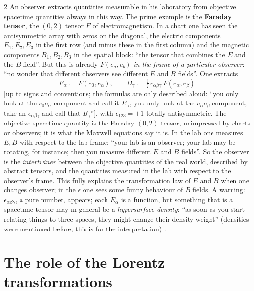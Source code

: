 \begin{paracol}{2}
An observer extracts quantities measurable in his laboratory from objective spacetime quantities always in this way. The prime example is the \textbf{Faraday tensor}, the $(0,2)$ tensor $F$ of electromagnetism. In a chart one has seen the antisymmetric array with zeros on the diagonal, the electric components $E_1,E_2,E_3$ in the first row (and minus these in the first column) and the magnetic components $B_1,B_2,B_3$ in the spatial block: ``the tensor that combines the $E$ and the $B$ field''. But this is already $F(e_a,e_b)$ \emph{in the frame of a particular observer}: ``no wonder that different observers see different $E$ and $B$ fields''. One extracts
\[
  E_\alpha:=F(e_0,e_\alpha),\qquad B_\gamma:=\tfrac12\,\epsilon_{\alpha\beta\gamma}\,F(e_\alpha,e_\beta)
\]
[up to signs and conventions; the formulas are only described aloud: ``you only look at the $e_0e_\alpha$ component and call it $E_\alpha$, you only look at the $e_\alpha e_\beta$ component, take an $\epsilon_{\alpha\beta\gamma}$ and call that $B_\gamma$''], with $\epsilon_{123}=+1$ totally antisymmetric. The objective spacetime quantity is the Faraday $(0,2)$ tensor, unimpressed by charts or observers; it is what the Maxwell equations say it is. In the lab one measures $E,B$ with respect to the lab frame: ``your lab is an observer; your lab may be rotating, for instance; then you measure different $E$ and $B$ fields''. So the observer is the \emph{intertwiner} between the objective quantities of the real world, described by abstract tensors, and the quantities measured in the lab with respect to the observer's frame. This fully explains the transformation law of $E$ and $B$ when one changes observer; in the $\epsilon$ one sees some funny behaviour of $B$ fields. A warning: $\epsilon_{\alpha\beta\gamma}$, a pure number, appears; each $E_\alpha$ is a function, but something that is a spacetime tensor may in general be a \emph{hypersurface density}: ``as soon as you start relating things to three-spaces, they might change their density weight'' (densities were mentioned before; this is for the interpretation) .

\section{The role of the Lorentz transformations}\label{sec:c13-lorentz}


\end{paracol}
